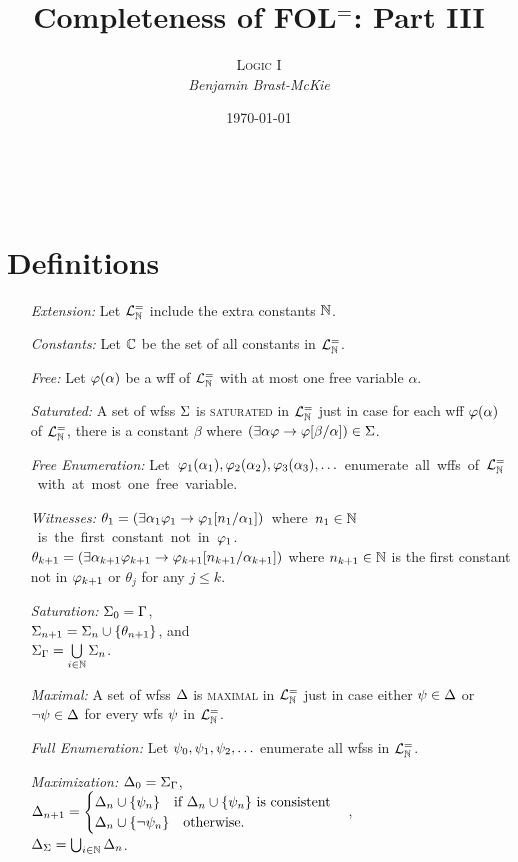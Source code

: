 \documentclass[a4paper, 11pt]{article} %
\title{\textbf{Completeness of FOL$^=$: Part III}} %
\author{\textsc{Logic I}\\ \em Benjamin Brast-McKie} %
\date{\today} %
\makeatletter
\renewcommand{\maketitle}{
\begin{flushright}
{\LARGE\@title}

\vspace{10pt}

{\@author}
\\ \@date
\end{flushright}

\vspace{-20pt}

}
\makeatother
\begin{document}
\maketitle %

\thispagestyle{empty}


\section*{Definitions}

\begin{itemize}
  \item[\it Extension:] Let $\mathcal{L}^{=}_{\mathbb{N}}$ include the extra constants $\mathbb{N}$.
  \item[\it Constants:] Let $\mathbb{C}$ be the set of all constants in $\mathcal{L}^{=}_{\mathbb{N}}$.
  \item[\it Free:] Let $\varphi(\alpha)$ be a wff of $\mathcal{L}^{=}_{\mathbb{N}}$ with at most one free variable $\alpha$.
  \item[\it Saturated:] A set of wfss $\Sigma$ is \textsc{saturated} in $\mathcal{L}^{=}_{\mathbb{N}}$ just in case for each wff $\varphi(\alpha)$ of $\mathcal{L}^{=}_{\mathbb{N}}$, there is a constant $\beta$ where $(\exists \alpha\varphi \rightarrow \varphi[\beta/\alpha])\in\Sigma$.
  \item[\it Free Enumeration:] \mbox{Let $\varphi_1(\alpha_1),\varphi_2(\alpha_2),\varphi_3(\alpha_3),\ldots$ enumerate all wffs of $\mathcal{L}^{=}_{\mathbb{N}}$ with at most one free variable.}
  \item[\it Witnesses:] \mbox{$\theta_1=(\exists \alpha_1\varphi_1\rightarrow \varphi_1[n_1/\alpha_1])$ where $n_1\in\mathbb{N}$ is the first constant not in $\varphi_1$.}\vspace{.05in}\\
    $\theta_{k+1}=(\exists \alpha_{k+1}\varphi_{k+1}\rightarrow \varphi_{k+1}[n_{k+1}/\alpha_{k+1}])$  where $n_{k+1}\in\mathbb{N}$ is the first constant not in $\varphi_{k+1}$ or $\theta_j$ for any $j\leq k$.
  \item[\it Saturation:]
    $\Sigma_0 = \Gamma$,\\
    $\Sigma_{n+1} = \Sigma_n\cup\lbrace\theta_{n+1}\rbrace$, and\\
    $\Sigma_{\Gamma} = \bigcup\limits_{i\in\mathbb{N}}\Sigma_n$.
  \item[\it Maximal:] A set of wfss $\Delta$ is \textsc{maximal} in $\mathcal{L}^{=}_{\mathbb{N}}$ just in case either $\psi\in\Delta$ or $\neg\psi\in\Delta$ for every wfs $\psi$ in $\mathcal{L}^{=}_{\mathbb{N}}$.
  \item[\it Full Enumeration:] Let $\psi_0,\psi_1,\psi_2,\ldots$ enumerate all wfss in $\mathcal{L}^{=}_{\mathbb{N}}$.
  \item[\it Maximization:]
    $\Delta_0 = \Sigma_{\Gamma}$,\\ 
    $\Delta_{n+1} =
      \begin{cases}
        \Delta_n\cup\lbrace\psi_n\rbrace ~~\text{ if } \Delta_n\cup\lbrace\psi_n\rbrace \text{ is consistent}\\
        \Delta_n\cup\lbrace\neg\psi_n\rbrace ~~\text{ otherwise}.
      \end{cases}$,\\
    $\Delta_{\Sigma} = \bigcup_{i\in\mathbb{N}}\Delta_n$. 
\end{itemize}
\end{document}
